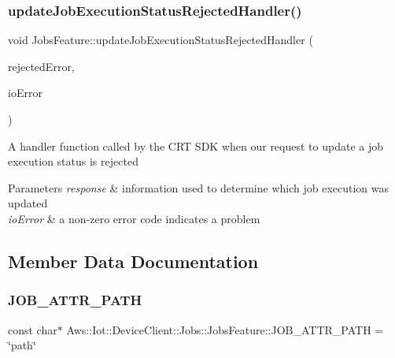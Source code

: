 \subsubsection{\texorpdfstring{update\+Job\+Execution\+Status\+Rejected\+Handler()}{updateJobExecutionStatusRejectedHandler()}}
{\footnotesize\ttfamily void Jobs\+Feature\+::update\+Job\+Execution\+Status\+Rejected\+Handler (\begin{DoxyParamCaption}\item[{Iotjobs\+::\+Rejected\+Error $\ast$}]{rejected\+Error,  }\item[{int}]{io\+Error }\end{DoxyParamCaption})\hspace{0.3cm}{\ttfamily [private]}}

A handler function called by the C\+RT S\+DK when our request to update a job execution status is rejected 
\begin{DoxyParams}{Parameters}
{\em response} & information used to determine which job execution was updated \\
\hline
{\em io\+Error} & a non-\/zero error code indicates a problem \\
\hline
\end{DoxyParams}


\subsection{Member Data Documentation}
\mbox{\label{class_aws_1_1_iot_1_1_device_client_1_1_jobs_1_1_jobs_feature_a7cb8aaf7a89223ff69bfa6752f35d7b3}} 
\subsubsection{\texorpdfstring{J\+O\+B\+\_\+\+A\+T\+T\+R\+\_\+\+P\+A\+TH}{JOB\_ATTR\_PATH}}
{\footnotesize\ttfamily const char$\ast$ Aws\+::\+Iot\+::\+Device\+Client\+::\+Jobs\+::\+Jobs\+Feature\+::\+J\+O\+B\+\_\+\+A\+T\+T\+R\+\_\+\+P\+A\+TH = \char`\"{}path\char`\"{}\hspace{0.3cm}{\ttfamily [private]}}



